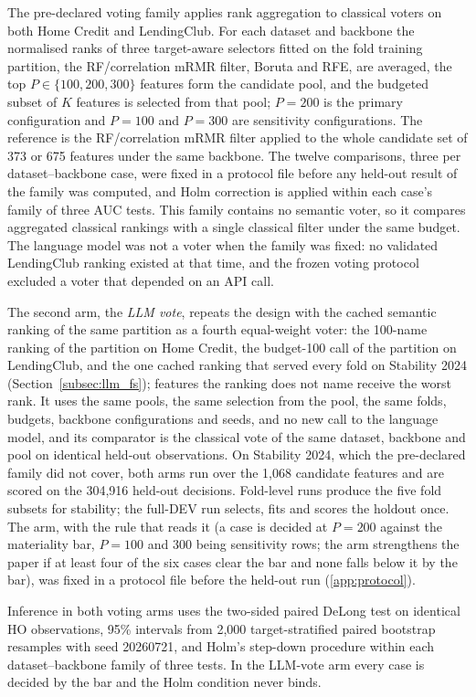 \documentclass[final,5p,twocolumn]{elsarticle}
\newcommand{\Kfeat}{K}
\begin{document}
The pre-declared voting family applies rank aggregation to classical voters on both Home Credit and LendingClub. For each dataset and backbone the normalised ranks of three target-aware selectors fitted on the fold training partition, the RF/correlation mRMR filter, Boruta and RFE, are averaged, the top $P\in\{100,200,300\}$ features form the candidate pool, and the budgeted subset of $\Kfeat$ features is selected from that pool; $P=200$ is the primary configuration and $P=100$ and $P=300$ are sensitivity configurations. The reference is the RF/correlation mRMR filter applied to the whole candidate set of 373 or 675 features under the same backbone. The twelve comparisons, three per dataset--backbone case, were fixed in a protocol file before any held-out result of the family was computed, and Holm correction is applied within each case's family of three AUC tests. This family contains no semantic voter, so it compares aggregated classical rankings with a single classical filter under the same budget. The language model was not a voter when the family was fixed: no validated LendingClub ranking existed at that time, and the frozen voting protocol excluded a voter that depended on an API call.

The second arm, the \emph{LLM vote}, repeats the design with the cached semantic ranking of the same partition as a fourth equal-weight voter: the 100-name ranking of the partition on Home Credit, the budget-100 call of the partition on LendingClub, and the one cached ranking that served every fold on Stability 2024 (Section~\ref{subsec:llm_fs}); features the ranking does not name receive the worst rank. It uses the same pools, the same selection from the pool, the same folds, budgets, backbone configurations and seeds, and no new call to the language model, and its comparator is the classical vote of the same dataset, backbone and pool on identical held-out observations. On Stability 2024, which the pre-declared family did not cover, both arms run over the 1,068 candidate features and are scored on the 304,916 held-out decisions. Fold-level runs produce the five fold subsets for stability; the full-DEV run selects, fits and scores the holdout once. The arm, with the rule that reads it (a case is decided at $P=200$ against the materiality bar, $P=100$ and $300$ being sensitivity rows; the arm strengthens the paper if at least four of the six cases clear the bar and none falls below it by the bar), was fixed in a protocol file before the held-out run (\ref{app:protocol}).

Inference in both voting arms uses the two-sided paired DeLong test \cite{delong1988} on identical HO observations, 95\% intervals from 2,000 target-stratified paired bootstrap resamples with seed 20260721, and Holm's step-down procedure \cite{holm1979} within each dataset--backbone family of three tests. In the LLM-vote arm every case is decided by the bar and the Holm condition never binds.
\end{document}
